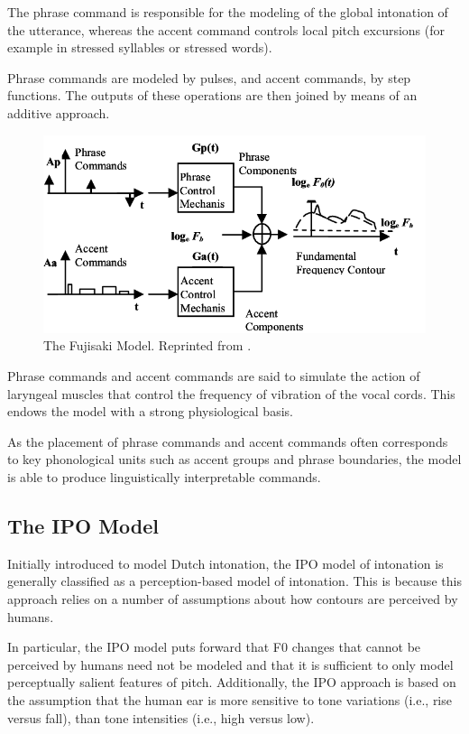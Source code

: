 The phrase command is responsible for the modeling of the global intonation of the utterance, whereas the accent command controls local pitch excursions (for example in stressed syllables or stressed words).

Phrase commands are modeled by pulses, and accent commands, by step functions.
The outputs of these operations are then joined by means of an additive approach.

\begin{figure}[H]
\centering
\includegraphics[scale=1.2]{figures/fujisaki-model.png}
\caption[The Fujisaki model]{The Fujisaki Model. Reprinted from \citet{Fujisaki2002modeling}.}
\end{figure}


Phrase commands and accent commands are said to simulate the action of laryngeal muscles that control the frequency of vibration of the vocal cords. 
This endows the model with a strong physiological basis.

As the placement of phrase commands and accent commands often corresponds to key phonological units such as accent groups and phrase boundaries, the model is able to produce linguistically interpretable commands.



\subsection{The IPO Model}

Initially introduced to model Dutch intonation, the IPO model of intonation \citep{Gussenhoven1992Perceptual} is generally classified as a perception-based model of intonation.
This is because this approach relies on a number of assumptions about how contours are perceived by humans.

In particular, the IPO model puts forward that \ac{F0} changes that cannot be perceived by humans need not be modeled and that it is sufficient to only model perceptually salient features of pitch.
Additionally, the IPO approach is based on the assumption that the human ear is more sensitive to tone variations (i.e., rise versus fall), than tone intensities (i.e., high versus low).

